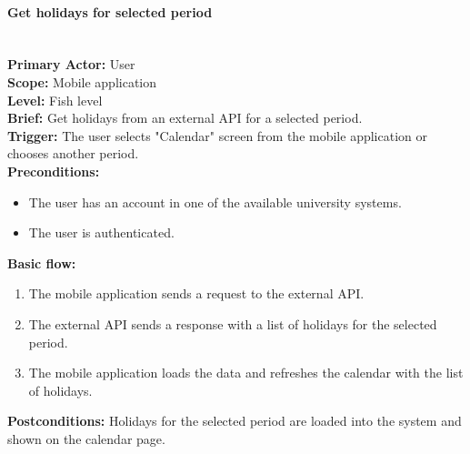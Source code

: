 \paragraph{\large{Get holidays for selected period}}\mbox{}\\[2pt]
\textbf{Primary Actor:} User\\
\textbf{Scope:} Mobile application\\
\textbf{Level:} Fish level\\
\textbf{Brief:} Get holidays from an external API for a selected period.\\
\textbf{Trigger:} The user selects "Calendar" screen from the mobile application or chooses another period.\\
\textbf{Preconditions:}
\begin{itemize}
    \item The user has an account in one of the available university systems.
    \item The user is authenticated.
\end{itemize}
\textbf{Basic flow:}
\begin{enumerate}
    \item The mobile application sends a request to the external API.
    \item The external API sends a response with a list of holidays for the selected period.
    \item The mobile application loads the data and refreshes the calendar with the list of holidays.
\end{enumerate}
\textbf{Postconditions:}
Holidays for the selected period are loaded into the system and shown on the calendar page.


